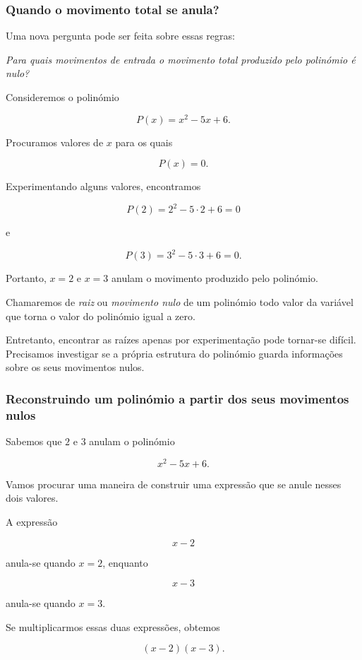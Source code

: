 \documentclass[12pt,a4paper]{article}
\begin{document}
\subsubsection{Quando o movimento total se anula?}

Uma nova pergunta pode ser feita sobre essas regras:

\begin{center}
\emph{Para quais movimentos de entrada o movimento total produzido pelo
polinómio é nulo?}
\end{center}

Consideremos o polinómio

\[
P(x)=x^2-5x+6.
\]

Procuramos valores de \(x\) para os quais

\[
P(x)=0.
\]

Experimentando alguns valores, encontramos

\[
P(2)=2^2-5\cdot2+6=0
\]

e

\[
P(3)=3^2-5\cdot3+6=0.
\]

Portanto, \(x=2\) e \(x=3\) anulam o movimento produzido pelo
polinómio.

Chamaremos de \emph{raiz} ou \emph{movimento nulo} de um polinómio todo
valor da variável que torna o valor do polinómio igual a zero.

Entretanto, encontrar as raízes apenas por experimentação pode tornar-se
difícil. Precisamos investigar se a própria estrutura do polinómio
guarda informações sobre os seus movimentos nulos.

\subsubsection{Reconstruindo um polinómio a partir dos seus movimentos
nulos}

Sabemos que \(2\) e \(3\) anulam o polinómio

\[
x^2-5x+6.
\]

Vamos procurar uma maneira de construir uma expressão que se anule
nesses dois valores.

A expressão

\[
x-2
\]

anula-se quando \(x=2\), enquanto

\[
x-3
\]

anula-se quando \(x=3\).

Se multiplicarmos essas duas expressões, obtemos

\[
(x-2)(x-3).
\]
\end{document}
